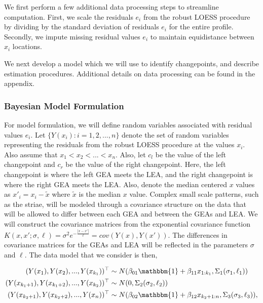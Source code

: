\documentclass[12pt]{article}
\begin{document}
We first perform a few additional data processing steps to streamline
computation. First, we scale the residuals \(e_i\) from the robust LOESS
procedure by dividing by the standard deviation of residuals \(e_i\) for
the entire profile. Secondly, we impute missing residual values \(e_i\)
to maintain equidistance between \(x_i\) locations.

We next develop a model which we will use to identify changepoints, and
describe estimation procedures. Additional details on data processing
can be found in the appendix.

\subsubsection{Bayesian Model Formulation}

For model formulation, we will define random variables associated with
residual values \(e_i\). Let \(\{Y(x_i): i = 1,2, ..., n\}\) denote the
set of random variables representing the residuals from the robust LOESS
procedure at the values \(x_i\). Also assume that
\(x_1 < x_2 < ... < x_n\). Also, let \(c_l\) be the value of the left
changepoint and \(c_r\) be the value of the right changepoint. Here, the
left changepoint is where the left GEA meets the LEA, and the right
changepoint is where the right GEA meets the LEA. Also, denote the
median centered \(x\) values as \(x'_i = x_i - \tilde{x}\) where
\(\tilde{x}\) is the median \(x\) value. Complex small scale patterns,
such as the striae, will be modeled through a covariance structure on
the data that will be allowed to differ between each GEA and between the
GEAs and LEA. We will construct the covariance matrices from the
exponential covariance function
\(K(x, x';\sigma, \ell) = \sigma^2 e^{-\frac{|x - x'|}{\ell}} = cov(Y(x), Y(x'))\).
The differences in covariance matrices for the GEAs and LEA will be
reflected in the parameters \(\sigma\) and \(\ell\). The data model that
we consider is then,

\begin{align}
(Y(x_1), Y(x_2), ..., Y(x_{k_1}))^{\top} &\sim N(\beta_{01}\mathbbm{1} + \beta_{11} x_{1:k_1}, \Sigma_1(\sigma_1, \ell_1)) \\
(Y(x_{k_1 + 1}), Y(x_{k_1 + 2}), ..., Y(x_{k_2}))^{\top} &\sim N(0, \Sigma_2(\sigma_2, \ell_2)) \\ 
(Y(x_{k_2 + 1}), Y(x_{k_2 + 2}), ..., Y(x_n))^{\top} &\sim N(\beta_{02}\mathbbm{1} + \beta_{12} x_{k_2 + 1:n}, \Sigma_3(\sigma_3, \ell_3)),
\end{align}
\end{document}
